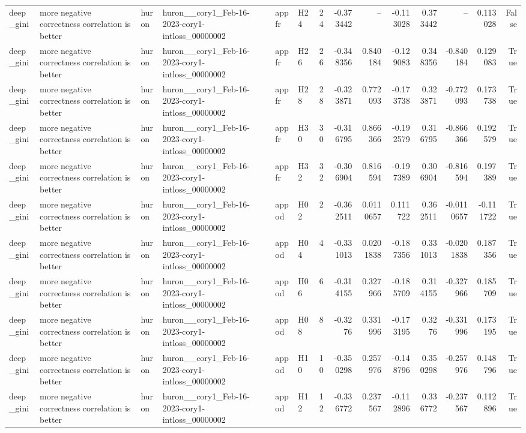 \begin{longtable}{llllllrrrrrrrr}
deep\_gini & more negative correctness correlation is better & huron & huron\_\_cory1\_Feb-16-2023-cory1-intloss\_00000002 & appfr & H24 & 24 & -0.373442 & -- & -0.113028 & 0.373442 & -- & 0.113028 & False \\
deep\_gini & more negative correctness correlation is better & huron & huron\_\_cory1\_Feb-16-2023-cory1-intloss\_00000002 & appfr & H26 & 26 & -0.348356 & 0.840184 & -0.129083 & 0.348356 & -0.840184 & 0.129083 & True \\
deep\_gini & more negative correctness correlation is better & huron & huron\_\_cory1\_Feb-16-2023-cory1-intloss\_00000002 & appfr & H28 & 28 & -0.323871 & 0.772093 & -0.173738 & 0.323871 & -0.772093 & 0.173738 & True \\
deep\_gini & more negative correctness correlation is better & huron & huron\_\_cory1\_Feb-16-2023-cory1-intloss\_00000002 & appfr & H30 & 30 & -0.316795 & 0.866366 & -0.192579 & 0.316795 & -0.866366 & 0.192579 & True \\
deep\_gini & more negative correctness correlation is better & huron & huron\_\_cory1\_Feb-16-2023-cory1-intloss\_00000002 & appfr & H32 & 32 & -0.306904 & 0.816594 & -0.197389 & 0.306904 & -0.816594 & 0.197389 & True \\
deep\_gini & more negative correctness correlation is better & huron & huron\_\_cory1\_Feb-16-2023-cory1-intloss\_00000002 & appod & H02 & 2 & -0.362511 & 0.0110657 & 0.111722 & 0.362511 & -0.0110657 & -0.111722 & True \\
deep\_gini & more negative correctness correlation is better & huron & huron\_\_cory1\_Feb-16-2023-cory1-intloss\_00000002 & appod & H04 & 4 & -0.331013 & 0.0201838 & -0.187356 & 0.331013 & -0.0201838 & 0.187356 & True \\
deep\_gini & more negative correctness correlation is better & huron & huron\_\_cory1\_Feb-16-2023-cory1-intloss\_00000002 & appod & H06 & 6 & -0.314155 & 0.327966 & -0.185709 & 0.314155 & -0.327966 & 0.185709 & True \\
deep\_gini & more negative correctness correlation is better & huron & huron\_\_cory1\_Feb-16-2023-cory1-intloss\_00000002 & appod & H08 & 8 & -0.3276 & 0.331996 & -0.173195 & 0.3276 & -0.331996 & 0.173195 & True \\
deep\_gini & more negative correctness correlation is better & huron & huron\_\_cory1\_Feb-16-2023-cory1-intloss\_00000002 & appod & H10 & 10 & -0.350298 & 0.257976 & -0.148796 & 0.350298 & -0.257976 & 0.148796 & True \\
deep\_gini & more negative correctness correlation is better & huron & huron\_\_cory1\_Feb-16-2023-cory1-intloss\_00000002 & appod & H12 & 12 & -0.336772 & 0.237567 & -0.112896 & 0.336772 & -0.237567 & 0.112896 & True \\

\end{longtable}
